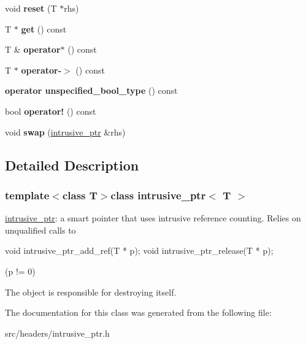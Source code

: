 \begin{DoxyCompactItemize}
\item 
\hypertarget{classintrusive__ptr_a81e2fb688afba02de9ecf2006caeb62e}{void {\bfseries reset} (T $\ast$rhs)}\label{classintrusive__ptr_a81e2fb688afba02de9ecf2006caeb62e}

\item 
\hypertarget{classintrusive__ptr_a70192c07e3ff5035942095a5d2d97c34}{T $\ast$ {\bfseries get} () const }\label{classintrusive__ptr_a70192c07e3ff5035942095a5d2d97c34}

\item 
\hypertarget{classintrusive__ptr_a63f7f0b02c547127f9f68ecdb01f7aa6}{T \& {\bfseries operator$\ast$} () const }\label{classintrusive__ptr_a63f7f0b02c547127f9f68ecdb01f7aa6}

\item 
\hypertarget{classintrusive__ptr_a4756c9e89a1a057e2c911d8224197d31}{T $\ast$ {\bfseries operator-\/$>$} () const }\label{classintrusive__ptr_a4756c9e89a1a057e2c911d8224197d31}

\item 
\hypertarget{classintrusive__ptr_a1a71711829594617e226fada9b7ef351}{{\bfseries operator unspecified\-\_\-bool\-\_\-type} () const }\label{classintrusive__ptr_a1a71711829594617e226fada9b7ef351}

\item 
\hypertarget{classintrusive__ptr_aee167762c6829dac96f664b4ab505e39}{bool {\bfseries operator!} () const }\label{classintrusive__ptr_aee167762c6829dac96f664b4ab505e39}

\item 
\hypertarget{classintrusive__ptr_a95826a79f706bc5c6b9fd28ae334e974}{void {\bfseries swap} (\hyperlink{classintrusive__ptr}{intrusive\-\_\-ptr} \&rhs)}\label{classintrusive__ptr_a95826a79f706bc5c6b9fd28ae334e974}

\end{DoxyCompactItemize}


\subsection{Detailed Description}
\subsubsection*{template$<$class T$>$class intrusive\-\_\-ptr$<$ T $>$}

\hyperlink{classintrusive__ptr}{intrusive\-\_\-ptr}\-: a smart pointer that uses intrusive reference counting. Relies on unqualified calls to 
\begin{DoxyPre}
     void intrusive\_ptr\_add\_ref(T * p);
     void intrusive\_ptr\_release(T * p);
\end{DoxyPre}
 (p != 0)

The object is responsible for destroying itself. 

The documentation for this class was generated from the following file\-:\begin{DoxyCompactItemize}
\item 
src/headers/intrusive\-\_\-ptr.\-h\end{DoxyCompactItemize}
